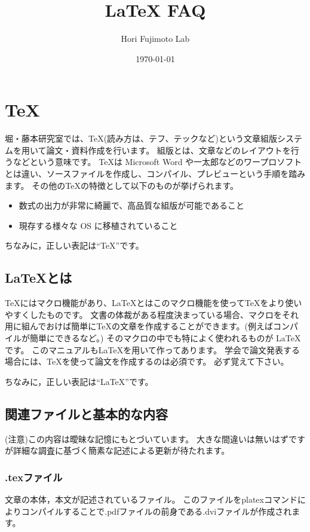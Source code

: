 \documentclass[10pt,a4paper,oneside,twocolumn,fleqn,dvipdfmx]{jsarticle}
\title{{\LaTeX} FAQ}
\author{Hori Fujimoto Lab}
\date{\today}
\begin{document}
\maketitle

\section{\TeX}
堀・藤本研究室では、\TeX (読み方は、テフ、テックなど)という文章組版システムを用いて論文・資料作成を行います。
組版とは、文章などのレイアウトを行うなどという意味です。
\TeX は Microsoft Word や一太郎などのワープロソフトとは違い、ソースファイルを作成し、コンパイル、プレビューという手順を踏みます。
その他の\TeX の特徴として以下のものが挙げられます。

\begin{itemize}
	\item  数式の出力が非常に綺麗で、高品質な組版が可能であること
	\item 現存する様々な OS に移植されていること
\end{itemize}

ちなみに，正しい表記は``TeX''です。

\subsection{\LaTeX とは}
\TeX にはマクロ機能があり、\LaTeX とはこのマクロ機能を使って\TeX をより使いやすくしたものです。
文書の体裁がある程度決まっている場合、マクロをそれ用に組んでおけば簡単に\TeX の文章を作成することができます。(例えばコンパイルが簡単にできるなど。)
そのマクロの中でも特によく使われるものが \LaTeX です。
このマニュアルも\LaTeX を用いて作ってあります。
学会で論文発表する場合には、\TeX を使って論文を作成するのは必須です。
必ず覚えて下さい。

ちなみに，正しい表記は``LaTeX''です。

\subsection{関連ファイルと基本的な内容}
(注意)この内容は曖昧な記憶にもとづいています。
大きな間違いは無いはずですが詳細な調査に基づく簡素な記述による更新が待たれます。

\subsubsection*{.texファイル}
文章の本体，本文が記述されているファイル。
このファイルをplatexコマンドによりコンパイルすることで.pdfファイルの前身である.dviファイルが作成されます。
\end{document}
